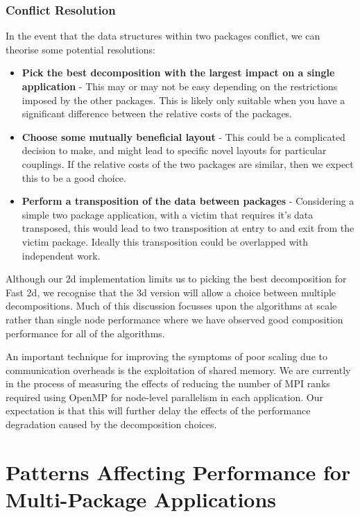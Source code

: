 \documentclass[runningheads,a4paper]{llncs}
\begin{document}
\subsubsection{Conflict Resolution}

In the event that the data structures within two packages conflict, we can theorise some potential resolutions:

\begin{itemize}
  \item \textbf{Pick the best decomposition with the largest impact on a single application} - This may or may not be easy depending on the restrictions imposed by the other packages. This is likely only suitable when you have a significant difference between the relative costs of the packages.
  \item \textbf{Choose some mutually beneficial layout} - This could be a complicated decision to make, and might lead to specific novel layouts for particular couplings. If the relative costs of the two packages are similar, then we expect this to be a good choice.
  \item \textbf{Perform a transposition of the data between packages} - Considering a simple two package application, with a victim that requires it's data transposed, this would lead to two transposition at entry to and exit from the victim package. Ideally this transposition could be overlapped with independent work.
\end{itemize}

Although our 2d implementation limits us to picking the best decomposition for Fast 2d, we recognise that the 3d version will allow a choice between multiple decompositions. Much of this discussion focusses upon the algorithms at scale rather than single node performance where we have observed good composition performance for all of the algorithms. 

An important technique for improving the symptoms of poor scaling due to communication overheads is the exploitation of shared memory. We are currently in the process of measuring the effects of reducing the number of MPI ranks required using OpenMP for node-level parallelism in each application. Our expectation is that this will further delay the effects of the performance degradation caused by the decomposition choices.

\section{Patterns Affecting Performance for Multi-Package Applications}
\end{document}
